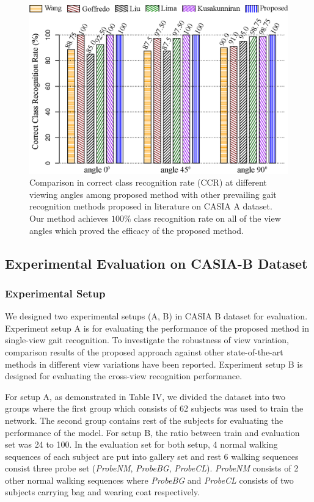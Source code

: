 \begin{figure}
	\centering
	\includegraphics[width = 120mm]{figures/casia_a_result.eps}
	\caption{
		Comparison in correct class recognition rate (CCR) at different viewing angles among proposed method with other prevailing gait recognition methods proposed in literature on CASIA A dataset. Our method achieves $ 100\% $ class recognition rate on all of the view angles which proved the efficacy of the proposed method.
	}
	\label{fig:casia_a_result}
\end{figure}



\subsection{Experimental Evaluation on CASIA-B Dataset}
\subsubsection{Experimental Setup}
We designed two experimental setups (A, B) in CASIA B dataset for evaluation. Experiment setup A is for evaluating the performance of the proposed method in single-view gait recognition. To investigate the robustness of view variation, comparison results of the proposed approach against other state-of-the-art methods in different view variations have been reported.  Experiment setup B is designed for evaluating the cross-view recognition performance. 

For setup A, as demonstrated in Table IV, we divided the dataset into two groups where the first group which consists of 62 subjects was used to train the network. The second group contains rest of the subjects for evaluating the performance of the model. For setup B, the ratio between train and evaluation set was 24 to 100. In the evaluation set for both setup, 4 normal walking sequences of each subject are put into gallery set and rest 6 walking sequences consist three probe set (\textit{ProbeNM}, \textit{ProbeBG}, \textit{ProbeCL}). \textit{ProbeNM} consists of 2 other normal walking sequences where \textit{ProbeBG} and \textit{ProbeCL} consists of two subjects carrying bag and wearing coat respectively.



